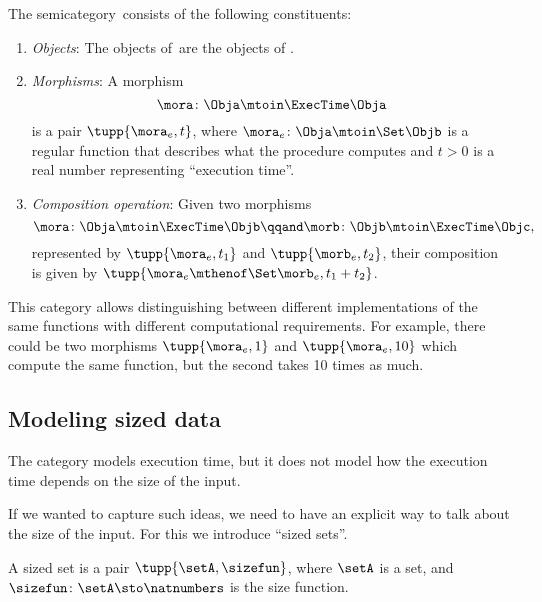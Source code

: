 \begin{definition}
    \label{def:ExecTime}
    The semicategory~\ExecTime consists of the following constituents:
    \begin{enumerate}
        \item \emph{Objects}: The objects of~\ExecTime are the objects of \Set.
        \item \emph{Morphisms}: A morphism
              \begin{equation}
                  \mora \colon \Obja \mtoin\ExecTime \Obja
              \end{equation}
              is a pair $\tupp{\mora_e, t}$, where $\mora_e \colon \Obja \mtoin\Set \Objb$ is a regular function that describes what the procedure computes and $t>0$ is a real number representing ``execution time''.
        \item \emph{Composition operation}: Given two morphisms
              \begin{equation}
                  \mora \colon  \Obja\mtoin\ExecTime \Objb \qqand
                  \morb \colon  \Objb\mtoin\ExecTime \Objc,
              \end{equation}
              represented by $\tupp{\mora_e, t_1}$ and $\tupp{\morb_e, t_2}$, their composition is given by $\tupp{\mora_e\mthenof\Set\morb_e, t_1 + t_2 }$.
    \end{enumerate}
\end{definition}

This category allows distinguishing between different implementations of the same functions with different computational requirements.
For example, there could be two morphisms  $\tupp{\mora_e, 1}$  and  $\tupp{\mora_e, 10}$ which compute the same function, but the second takes 10 times as much.

\subsection{Modeling sized data}

The category \ExecTime models execution time, but it does not model how the execution time depends on the size of the input.

If we wanted to capture such ideas, we need to have an explicit way to talk about the size of the input.
%
For this we introduce ``sized sets''.

\begin{definition}
    \label{def:sized-set}
    A sized set is a pair $\tupp{\setA, \sizefun}$, where $\setA$ is a set, and
    $\sizefun \colon \setA \sto \natnumbers$ is the size function.
\end{definition}

